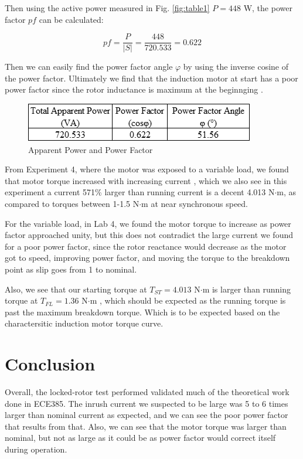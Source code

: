 \documentclass{IEEEtran}
\begin{document}
Then using the active power measured in Fig. \ref{fig:table1} \(P=448\) W, the power factor \(pf\) can be calculated:

\begin{equation}
    pf = \frac{P}{|S|} = \frac{448}{720.533} = 0.622    
\end{equation}

Then we can easily find the power factor angle \(\varphi\) by using the inverse cosine of the power factor. Ultimately we find that the induction motor at start has a poor power factor since the rotor inductance is maximum at the beginnging \cite{labmanual}.

\begin{figure}[h!]
    \includegraphics[width=\columnwidth]{table3.png}
    \caption{Apparent Power and Power Factor}
    \centering
    \label{fig:table3}
\end{figure}

From Experiment 4, where the motor was exposed to a variable load, we found that motor torque increased with increasing current \cite{lab4}, which we also see in this experiment a current 571\% larger than running current is a decent 4.013 N\(\cdot\)m, as compared to torques between 1-1.5 N\(\cdot\)m at near synchronous speed. 

For the variable load, in Lab 4, we found the motor torque to increase as power factor approached unity, but this does not contradict the large current we found for a poor power factor, since the rotor reactance would decrease as the motor got to speed, improving power factor, and moving the torque to the breakdown point as slip goes from 1 to nominal. 

Also, we see that our starting torque at \(T_{ST}=4.013\) N\(\cdot\)m is larger than running torque at \(T_{FL}=1.36\) N\(\cdot\)m , which should be expected as the running torque is past the maximum breakdown torque. Which is to be expected based on the charactersitic induction motor torque curve. 

\section{Conclusion}

Overall, the locked-rotor test performed validated much of the theoretical work done in ECE385. The inrush current we suspected to be large was 5 to 6 times larger than nominal current as expected, and we can see the poor power factor that results from that. Also, we can see that the motor torque was larger than nominal, but not as large as it could be as power factor would correct itself during operation.



\end{document}

